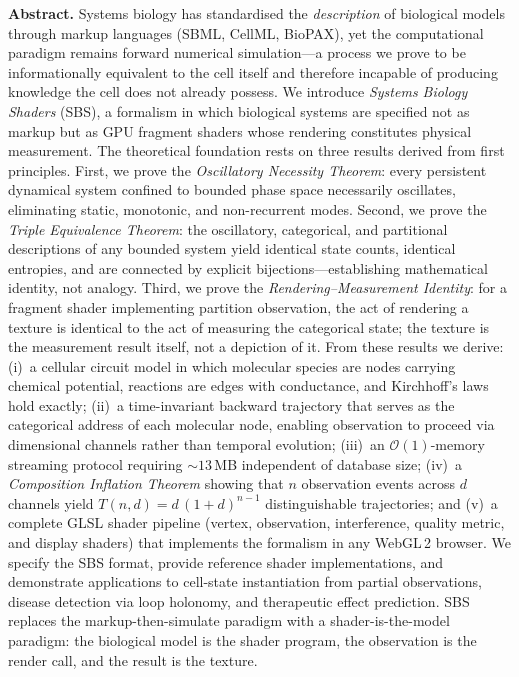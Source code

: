 \documentclass[11pt,twocolumn,a4paper]{article}
\newcommand{\BigO}{\mathcal{O}}
\begin{document}
\begin{@twocolumnfalse}
\begin{center}
\begin{minipage}{0.92\textwidth}
\textbf{Abstract.}
Systems biology has standardised the \emph{description} of biological
models through markup languages (SBML, CellML, BioPAX), yet the
computational paradigm remains forward numerical simulation---a process
we prove to be informationally equivalent to the cell itself and
therefore incapable of producing knowledge the cell does not already
possess.  We introduce \emph{Systems Biology Shaders} (SBS), a
formalism in which biological systems are specified not as markup but
as GPU fragment shaders whose rendering constitutes physical
measurement.  The theoretical foundation rests on three results derived
from first principles.  First, we prove the \emph{Oscillatory Necessity
Theorem}: every persistent dynamical system confined to bounded phase
space necessarily oscillates, eliminating static, monotonic, and
non-recurrent modes.  Second, we prove the \emph{Triple Equivalence
Theorem}: the oscillatory, categorical, and partitional descriptions
of any bounded system yield identical state counts, identical
entropies, and are connected by explicit bijections---establishing
mathematical identity, not analogy.  Third, we prove the
\emph{Rendering--Measurement Identity}: for a fragment shader
implementing partition observation, the act of rendering a texture is
identical to the act of measuring the categorical state; the texture
is the measurement result itself, not a depiction of it.  From these
results we derive: (i)~a cellular circuit model in which molecular
species are nodes carrying chemical potential, reactions are edges
with conductance, and Kirchhoff's laws hold exactly; (ii)~a
time-invariant backward trajectory that serves as the categorical
address of each molecular node, enabling observation to proceed via
dimensional channels rather than temporal evolution; (iii)~an
$\BigO(1)$-memory streaming protocol requiring $\sim\!13$\,MB
independent of database size; (iv)~a \emph{Composition Inflation
Theorem} showing that $n$ observation events across $d$ channels yield
$T(n,d) = d\,(1+d)^{n-1}$ distinguishable trajectories; and (v)~a
complete GLSL shader pipeline (vertex, observation, interference,
quality metric, and display shaders) that implements the formalism in
any WebGL\,2 browser.  We specify the SBS format, provide reference
shader implementations, and demonstrate applications to cell-state
instantiation from partial observations, disease detection via loop
holonomy, and therapeutic effect prediction.  SBS replaces the
markup-then-simulate paradigm with a shader-is-the-model paradigm:
the biological model is the shader program, the observation is the
render call, and the result is the texture.


\end{minipage}
\end{center}
\end{@twocolumnfalse}
\end{document}
